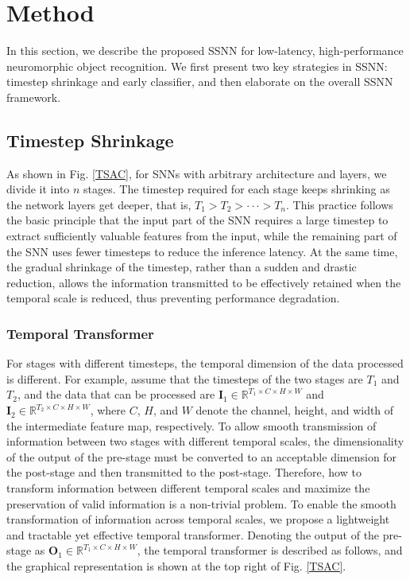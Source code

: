 \documentclass[letterpaper]{article} %
\begin{document}
\section{Method}
\label{Method}
In this section, we describe the proposed SSNN for low-latency, high-performance neuromorphic object recognition. We first present two key strategies in SSNN: timestep shrinkage and early classifier, and then elaborate on the overall SSNN framework.

\subsection{Timestep Shrinkage}
As shown in Fig. \ref{TSAC}, for SNNs with arbitrary architecture and layers, we divide it into $n$ stages. 
The timestep required for each stage keeps shrinking as the network layers get deeper, that is, $T_1>T_2>\cdot \cdot \cdot>T_n$. This practice follows the basic principle that the input part of the SNN requires a large timestep to extract sufficiently valuable features from the input, while the remaining part of the SNN uses fewer timesteps to reduce the inference latency. At the same time, the gradual shrinkage of the timestep, rather than a sudden and drastic reduction, allows the information transmitted to be effectively retained when the temporal scale is reduced, thus preventing performance degradation.

\subsubsection{Temporal Transformer}
For stages with different timesteps, the temporal dimension of the data processed is different. For example, assume that the timesteps of the two stages are $T_1$ and $T_2$, and the data that can be processed are $\boldsymbol{I}_1 \in \mathbb{R}^{T_1 \times C \times H \times W}$ and $\boldsymbol{I}_2 \in \mathbb{R}^{T_2 \times C \times H \times W}$, where $C$, $H$, and $W$ denote the channel, height, and width of the intermediate feature map, respectively. To allow smooth transmission of information between two stages with different temporal scales, the dimensionality of the output of the pre-stage must be converted to an acceptable dimension for the post-stage and then transmitted to the post-stage. Therefore, how to transform information between different temporal scales and maximize the preservation of valid information is a non-trivial problem. To enable the smooth transformation of information across temporal scales, we propose a lightweight and tractable yet effective temporal transformer. Denoting the output of the pre-stage as $\boldsymbol{O}_1 \in \mathbb{R}^{T_1 \times C \times H \times W}$, the temporal transformer is described as follows, and the graphical representation is shown at the top right of Fig. \ref{TSAC}.
\end{document}
